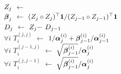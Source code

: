 \begin{algorithm2e}[t!]
{      \\
      {\color{\colormat} }
      {\color{\colormat} $Z_{j}$ $\gets$ }
      \\
      {\color{\colormat} $\boldsymbol{\beta}_j$ $\gets$ ${( Z_{j} \circ Z_{j} )^\top \mathbf 1}/{( Z_{j-1} \circ Z_{j-1} )^\top \mathbf 1}$}
      \\
      {\color{\colormat} $D_{j}$ $\gets$ $Z_{j} -$  $D_{j-1}$}
      \\
      {\color{\colornew} $\forall i$ \: $T_{i}^{(j,j)}$ $\gets$ $1/\boldsymbol{\alpha}_{j}^{(i)} + \boldsymbol{\beta}_{j-1}^{(i)}/\boldsymbol{\alpha}_{j-1}^{(i)}$}
      \\
      {\color{\colornew} $\forall i$ \: $T_{i}^{(j-1,j)}$ $\gets$ $\sqrt{\boldsymbol{\beta}_{j-1}^{(i)}}/\boldsymbol{\alpha}_{j}^{(i)}$}
			\\
      {\color{\colornew} $\forall i$ \: $T_{i}^{(j,j-1)}$ $\gets$ $\sqrt{\boldsymbol{\beta}_{j-1}^{(i)}}/\boldsymbol{\alpha}_{j}^{(i)}$}
    }
\end{algorithm2e}
